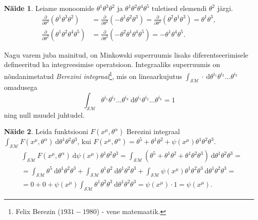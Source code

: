 \documentclass[12pt,a4paper,oneside]{article}
\theoremstyle{plain}
\theoremstyle{definition}
\newtheorem{naide}{Näide}[section]
\numberwithin{equation}{section}
\def\SM{{\mathcal {SM}}}
\begin{document}
\begin{naide}
Leiame monoomide $\theta^1 \theta^3 \theta^2$ ja 
$\theta^1 \theta^2 \theta^4 \theta^5$ tuletised elemendi 
$\theta^2$ järgi.
\begin{align*}
\frac{\partial}{\partial \theta^2} 
	\left( \theta^1 \theta^3 \theta^2\right) &= 
\frac{\partial}{\partial \theta^2} 
	\left(-\theta^1 \theta^2 \theta^3 \right) = 
\frac{\partial}{\partial \theta^2} 
	\left(\theta^2 \theta^1 \theta^3 \right) = \theta^1 \theta^3,\\
%
\frac{\partial}{\partial \theta^2} 
	\left( \theta^1 \theta^2 \theta^4 \theta^5 \right) &= 
\frac{\partial}{\partial \theta^2} 
	\left(- \theta^2 \theta^1 \theta^4 \theta^5 \right) = 
	- \theta^1 \theta^4 \theta^5.
\end{align*}
\end{naide}

Nagu varem juba mainitud, on Minkowski superruumis lisaks 
diferentseerimisele defineeritud ka integreesimise operatsioon. 
Integraaliks superruumis on nõnda\-nimetatud \emph{Berezini 
integraal}\footnote{Felix Berezin ($1931 - 1980$) - vene 
matemaatik.}, mis on lineaarkujutus $\int_{\SM} 
\cdot \ \mathrm{d} \theta^{i_1} \theta^{i_2} \ldots \theta^{i_k}$ 
omadusega
\[\int_{\SM} \theta^{i_1} \theta^{i_2} 
	\ldots \theta^{i_k} \ 
	\mathrm{d} \theta^{i_1} \theta^{i_2} \ldots \theta^{i_k} = 1\]
ning null muudel juhtudel.

\begin{naide}
Leida funktsiooni $F\left(x^{\mu}, \theta^{\alpha}\right)$ 
Berezini integraal $\int_{\SM} F\left(x^{\mu}, 
\theta^{\alpha}\right) \ \mathrm{d} \theta^1 \theta^2 
\theta^3$, kui $F\left(x^{\mu}, \theta^{\alpha}\right) = 
	\theta^5 + \theta^1 \theta^2 + 
	\psi\left(x^{\mu}\right) \theta^1 \theta^2 \theta^3$.
\begin{align*}
&\int_{\SM} F\left(x^{\mu}, 
	\theta^{\alpha}\right) \ \mathrm{d} 
	\psi\left(x^{\mu}\right) \theta^1 \theta^2 \theta^3 = 
\int_{\SM} \left(\theta^5 + \theta^1 \theta^2 + 
	\theta^1 \theta^2 \theta^3\right) \ 
	\mathrm{d} \theta^1 \theta^2 \theta^3 = \\
&= \int_{\SM} \theta^5 \ \mathrm{d} \theta^1 \theta^2 \theta^3 +
\int_{\SM} \theta^1 \theta^2 \ 
	\mathrm{d} \theta^1 \theta^2 \theta^3 + 
\int_{\SM} \psi\left(x^{\mu}\right) 
	\theta^1 \theta^2 \theta^3 \ 
	\mathrm{d} \theta^1 \theta^2 \theta^3 = \\
&= 0 + 0 + \psi\left(x^{\mu}\right) 
	\int_{\SM} \theta^1 \theta^2 \theta^3 \ 
	\mathrm{d} \theta^1 \theta^2 \theta^3= 
	\psi\left(x^{\mu}\right) \cdot 1 = \psi\left(x^{\mu}\right).
\end{align*}
\end{naide}
\end{document}
